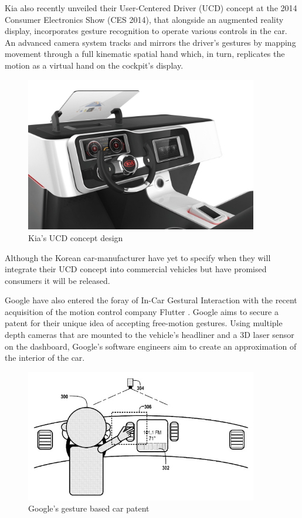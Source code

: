 \documentclass{l4proj}
\begin{document}
Kia also recently unveiled their User-Centered Driver (UCD) concept at the 2014 Consumer Electronics Show (CES 2014), that alongside an augmented reality display, incorporates gesture recognition to operate various controls in the car. An advanced camera system tracks and mirrors the driver's gestures by mapping movement through a full kinematic spatial hand which, in turn, replicates the motion as a virtual hand on the cockpit's display.
\begin{figure}[h!]
\centering
\includegraphics[width=4in]{images/kia.jpg}
\caption{Kia's UCD concept design}
\label{fig:kia}
\end{figure}

Although the Korean car-manufacturer have yet to specify when they will integrate their UCD concept into commercial vehicles but have promised consumers it will be released. 

Google have also entered the foray of In-Car Gestural Interaction with the recent acquisition of the motion control company Flutter \cite{flut}. Google aims to secure a patent for their unique idea of accepting free-motion gestures. Using multiple depth cameras that are mounted to the vehicle's headliner and a 3D laser sensor on the dashboard, Google's software engineers aim to create an approximation of the interior of the car. 
\begin{figure}[h!]
\centering
\includegraphics[width=4in]{images/google.jpg}
\caption{Google's gesture based car patent}
\label{fig:google}
\end{figure}
\end{document}
